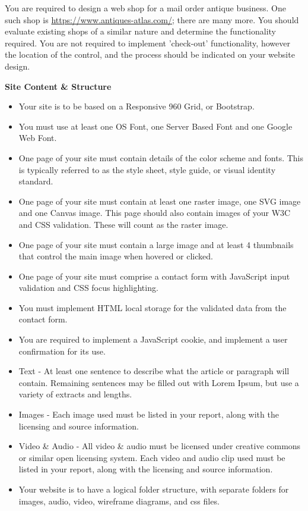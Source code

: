 You are required to design a web shop for a mail order antique business.  One such shop is \href{https://www.antiques-atlas.com/}{https://www.antiques-atlas.com/}; there are many more.  You should evaluate existing shops of a similar nature and determine the functionality required.  You are not required to implement 'check-out' functionality, however the location of the control, and the process should be indicated on your website design.





\vspace{.5cm}

\textbf{Site Content \& Structure}\\

\begin{itemize}
	\item Your site is to be based on a Responsive 960 Grid, or Bootstrap.
	\item You must use at least one OS Font, one Server Based Font and one Google Web Font.
	\item One page of your site must contain details of the color scheme and fonts. This is typically referred to as the style sheet, style guide, or visual identity standard. 
	\item One page of your site must contain at least one raster image, one SVG image and one Canvas image.  This page should also contain images of your W3C and CSS validation.  These will count as the raster image.
	\item One page of your site must contain a large image and at least 4 thumbnails that control the main image when hovered or clicked.
	\item One page of your site must comprise a contact form with JavaScript input validation and CSS focus highlighting.
	\item You must implement HTML local storage for the validated data from the contact form.
	\item You are required to implement a JavaScript cookie, and implement a user confirmation for its use. 
	\item Text - At least one sentence to describe what the article or paragraph will contain.  Remaining sentences may be filled out with Lorem Ipsum, but use a variety of extracts and lengths.
	\item Images - Each image used must be listed in your report, along with the licensing and source information.   
	\item Video \& Audio - All video \& audio must be licensed under creative commons or similar open licensing system.  Each video and audio clip used must be listed in your report, along with the licensing and source information.
	\item Your website is to have a logical folder structure, with separate folders for images, audio, video, wireframe diagrams, and css files. 
\end{itemize}


